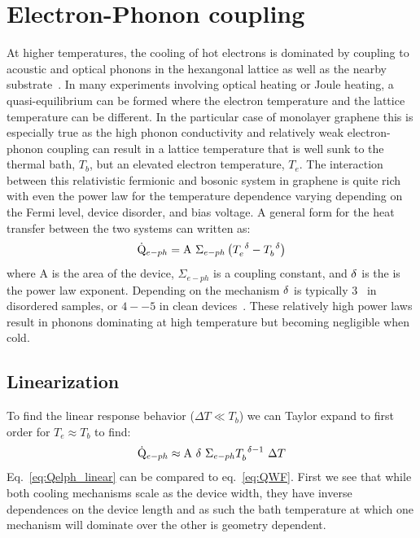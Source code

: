 \section{Electron-Phonon coupling}
At higher temperatures, the cooling of hot electrons is dominated by coupling to acoustic and optical phonons in the hexangonal lattice as well as the nearby substrate~\cite{viljas_electron-phonon_2010,bistritzer_electronic_2009}. In many experiments involving optical heating or Joule heating, a quasi-equilibrium can be formed where the electron temperature and the lattice temperature can be different. In the particular case of monolayer graphene this is especially true as the high phonon conductivity and relatively weak electron-phonon coupling can result in a lattice temperature that is well sunk to the thermal bath, $T_b$, but an elevated electron temperature, $T_e$. The interaction between this relativistic fermionic and bosonic system in graphene is quite rich with even the power law for the temperature dependence varying depending on the Fermi level, device disorder, and bias voltage. A general form for the heat transfer between the two systems can written as:
\begin{equation}\label{eq:Qelph}
\dot{\mathrm{Q}}_{e-ph}=\mathrm{A}~\Sigma_{e-ph}\left( T_e^{~\mathrm{\delta}} - T_b^{~\mathrm{\delta}} \right)
\end{equation}
where $\mathrm{A}$ is the area of the device, $\Sigma_{e-ph}$ is a coupling constant, and $\mathrm{\delta}$ is the is the power law exponent. Depending on the mechanism $\mathrm{\delta}$ is typically $3$~\cite{song_disorder-assisted_2012, chen_electron-phonon_2012} in disordered samples,  or $4--5$ in clean devices~\cite{viljas_electron-phonon_2010, bistritzer_electronic_2009}. These relatively high power laws result in phonons dominating at high temperature but becoming negligible when cold.
\subsection{Linearization}
To find the linear response behavior ($\Delta T \ll T_b$) we can Taylor expand to first order for $T_e\approx T_b$ to find:
\begin{equation}\label{eq:Qelph_linear}
\dot{\mathrm{Q}}_{e-ph} \approx \mathrm{A}~\mathrm{\delta}~\Sigma_{e-ph}T_b^{~\mathrm{\delta}-1}~\Delta T
\end{equation}
Eq.~\ref{eq:Qelph_linear} can be compared to eq.~\ref{eq:QWF}. First we see that while both cooling mechanisms scale as the device width, they have inverse dependences on the device length and as such the bath temperature at which one mechanism will dominate over the other is geometry dependent.

